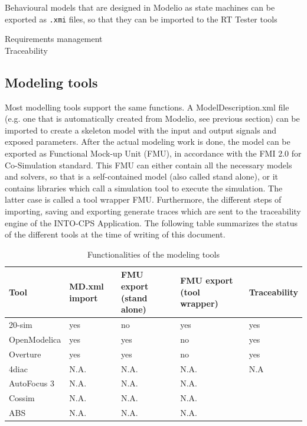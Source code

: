 Behavioural models that are designed in Modelio as state machines can be exported as \texttt{.xmi} files, so that they can be imported to the RT Tester tools

Requirements management\\
Traceability\\

\subsection{Modeling tools}

Most modelling tools support the same functions. A ModelDescription.xml file (e.g. one that is automatically created from Modelio, see previous section) can be imported to create a skeleton model with the input and output signals and exposed parameters. After the actual modeling work is done, the model can be exported as Functional Mock-up Unit (FMU), in accordance with the FMI 2.0 for Co-Simulation standard. This FMU can either contain all the necessary models and solvers, so that is a self-contained model (also called stand alone), or it contains libraries which call a simulation tool to execute the simulation. The latter case is called a tool wrapper FMU. Furthermore, the different steps of importing, saving and exporting generate traces which are sent to the traceability engine of the INTO-CPS Application. The following table summarizes the status of the different tools at the time of writing of this document.

\begin{table}[ht]
	\centering
		\begin{tabular}{l|p{2.5cm}|p{2.5cm}|p{2.5cm}|p{2.5cm}}
			Tool & MD.xml import & FMU export (stand alone) & FMU export (tool wrapper) & Traceability\\
			\hline
			20-sim & yes & no & yes & yes\\
			OpenModelica & yes & yes & no & yes\\
			Overture & yes & yes & no & yes\\
			4diac & N.A. & N.A. & N.A. & N.A \\
			AutoFocus 3 & N.A. & N.A. & N.A. \\
			Cossim & N.A. & N.A. & N.A. \\
			ABS & N.A. & N.A. & N.A. \\
		\end{tabular}
	\caption{Functionalities of the modeling tools}
	\label{tab:FunctionalitiesOfTheModelingTools}
\end{table}

